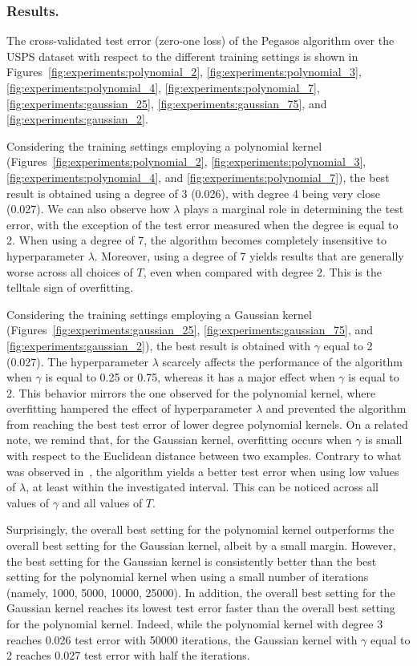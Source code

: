 \documentclass[runningheads]{llncs}
\begin{document}
\subsubsection{Results.} The cross-validated test error (zero-one loss) of the Pegasos algorithm over the USPS dataset with respect to the different training settings is shown in Figures~\ref{fig:experiments:polynomial_2}, \ref{fig:experiments:polynomial_3}, \ref{fig:experiments:polynomial_4}, \ref{fig:experiments:polynomial_7}, \ref{fig:experiments:gaussian_25}, \ref{fig:experiments:gaussian_75}, and \ref{fig:experiments:gaussian_2}.

Considering the training settings employing a polynomial kernel (Figures~\ref{fig:experiments:polynomial_2}, \ref{fig:experiments:polynomial_3}, \ref{fig:experiments:polynomial_4}, and \ref{fig:experiments:polynomial_7}), the best result is obtained using a degree of 3 (0.026), with degree 4 being very close (0.027). We can also observe how $\lambda$ plays a marginal role in determining the test error, with the exception of the test error measured when the degree is equal to 2. When using a degree of 7, the algorithm becomes completely insensitive to hyperparameter $\lambda$. Moreover, using a degree of 7 yields results that are generally worse across all choices of $T$, even when compared with degree 2. This is the telltale sign of overfitting.

Considering the training settings employing a Gaussian kernel (Figures~\ref{fig:experiments:gaussian_25}, \ref{fig:experiments:gaussian_75}, and \ref{fig:experiments:gaussian_2}), the best result is obtained with $\gamma$ equal to 2 (0.027). The hyperparameter $\lambda$ scarcely affects the performance of the algorithm when $\gamma$ is equal to 0.25 or 0.75, whereas it has a major effect when $\gamma$ is equal to 2. This behavior mirrors the one observed for the polynomial kernel, where overfitting hampered the effect of hyperparameter $\lambda$ and prevented the algorithm from reaching the best test error of lower degree polynomial kernels. On a related note, we remind that, for the Gaussian kernel, overfitting occurs when $\gamma$ is small with respect to the Euclidean distance between two examples. Contrary to what was observed in~\cite{shalev-pegasos-2011}, the algorithm yields a better test error when using low values of $\lambda$, at least within the investigated interval. This can be noticed across all values of $\gamma$ and all values of $T$.

Surprisingly, the overall best setting for the polynomial kernel outperforms the overall best setting for the Gaussian kernel, albeit by a small margin. However, the best setting for the Gaussian kernel is consistently better than the best setting for the polynomial kernel when using a small number of iterations (namely, 1000, 5000, 10000, 25000). In addition, the overall best setting for the Gaussian kernel reaches its lowest test error faster than the overall best setting for the polynomial kernel. Indeed, while the polynomial kernel with degree 3 reaches 0.026 test error with 50000 iterations, the Gaussian kernel with $\gamma$ equal to 2 reaches 0.027 test error with half the iterations.
\end{document}
